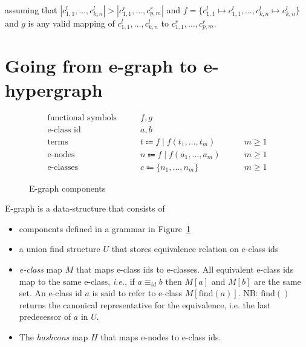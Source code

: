 assuming that $|c^{l}_{1,1}, \ldots, c^{l}_{k,n}| > |c^{r}_{1,1}, \ldots, c^{r}_{p,m}|$ and $f = \{ c^{l}_{1,1} \mapsto c^{l}_{1,1}, \ldots, c^{l}_{k,n} \mapsto c^{l}_{k,n} \}$ and $g$ is any valid mapping of $c^{l}_{1,1}, \ldots, c^{l}_{k,n}$ to $c^{r}_{1,1}, \ldots, c^{r}_{p,m}$.

\section{Going from e-graph to e-hypergraph}

\begin{figure}

\begin{align*}
    \text{functional symbols}& \hspace{2em} f,g\\
    \text{e-class id}& \hspace{2em} a,b\\
    \text{terms}& \hspace{2em} t \Coloneqq f \;|\; f (t_1, \ldots, t_m) \hspace{2em} &m \geq 1\\
    \text{e-nodes}& \hspace{2em} n \Coloneqq f \;|\; f (a_1, \ldots, a_m) \hspace{2em} &m \geq 1\\
    \text{e-classes}& \hspace{2em} c \Coloneqq \{n_1, \ldots, n_m\}   \hspace{2em} &m \geq 1
\end{align*}
\caption{E-graph components}
\label{fig:e-graph-components}
\end{figure}

\begin{definition}
    E-graph is a data-structure that consists of
    \begin{itemize}
        \item components defined in a grammar in Figure~\ref{fig:e-graph-components}
        \item a union find structure $U$ that stores equivalence relation on e-class ids
        \item \textit{e-class} map $M$ that maps e-class ids to e-classes. All equivalent e-class ids map to the same e-class, \textit{i.e.}, if $a \equiv_{id} b$ then $M[a]$ and $M[b]$ are the same set.
              An e-class id $a$ is said to refer to e-class $M[\text{find}(a)]$. NB: $\text{find}()$ returns the canonical representative for the equivalence, i.e. the last predecessor of $a$ in $U$.
        \item The \textit{hashcons} map $H$ that maps e-nodes to e-class ids.
    \end{itemize}
\end{definition}

